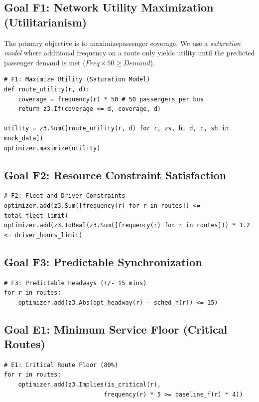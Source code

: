 \documentclass[]
{UCD_CS_41820_Report}
\begin{document}
\subsection{Goal F1: Network Utility Maximization (Utilitarianism)}
The primary objective is to maximizepassenger coverage. We use a \textit{saturation model} where additional frequency on a route only yields utility until the predicted passenger demand is met ($Freq \times 50 \geq Demand$).
\begin{lstlisting}[style=py]
# F1: Maximize Utility (Saturation Model)
def route_utility(r, d):
    coverage = frequency(r) * 50 # 50 passengers per bus
    return z3.If(coverage <= d, coverage, d)

utility = z3.Sum([route_utility(r, d) for r, zs, b, d, c, sh in mock_data])
optimizer.maximize(utility)
\end{lstlisting}

\subsection{Goal F2: Resource Constraint Satisfaction}
\begin{lstlisting}[style=py]
# F2: Fleet and Driver Constraints
optimizer.add(z3.Sum([frequency(r) for r in routes]) <= total_fleet_limit)
optimizer.add(z3.ToReal(z3.Sum([frequency(r) for r in routes])) * 1.2 <= driver_hours_limit)
\end{lstlisting}

\subsection{Goal F3: Predictable Synchronization}
\begin{lstlisting}[style=py]
# F3: Predictable Headways (+/- 15 mins)
for r in routes:
    optimizer.add(z3.Abs(opt_headway(r) - sched_h(r)) <= 15)
\end{lstlisting}

\subsection{Goal E1: Minimum Service Floor (Critical Routes)}
\begin{lstlisting}[style=py]
# E1: Critical Route Floor (80%)
for r in routes:
    optimizer.add(z3.Implies(is_critical(r), 
                            frequency(r) * 5 >= baseline_f(r) * 4))
\end{lstlisting}
\end{document}
